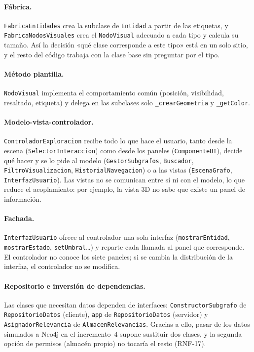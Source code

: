 \paragraph{Fábrica.} \texttt{FabricaEntidades} crea la subclase de \texttt{Entidad} a partir de las etiquetas, y \texttt{FabricaNodosVisuales} crea el \texttt{NodoVisual} adecuado a cada tipo y calcula su tamaño. Así la decisión «qué clase corresponde a este tipo» está en un solo sitio, y el resto del código trabaja con la clase base sin preguntar por el tipo.

\paragraph{Método plantilla.} \texttt{NodoVisual} implementa el comportamiento común (posición, visibilidad, resaltado, etiqueta) y delega en las subclases solo \texttt{\_crearGeometria} y \texttt{\_getColor}.

\paragraph{Modelo-vista-controlador.} \texttt{ControladorExploracion} recibe todo lo que hace el usuario, tanto desde la escena (\texttt{SelectorInteraccion}) como desde los paneles (\texttt{ComponenteUI}), decide qué hacer y se lo pide al modelo (\texttt{GestorSubgrafos}, \texttt{Buscador}, \texttt{FiltroVisualizacion}, \texttt{HistorialNavegacion}) o a las vistas (\texttt{EscenaGrafo}, \texttt{InterfazUsuario}). Las vistas no se comunican entre sí ni con el modelo, lo que reduce el acoplamiento: por ejemplo, la vista 3D no sabe que existe un panel de información.

\paragraph{Fachada.} \texttt{InterfazUsuario} ofrece al controlador una sola interfaz (\texttt{mostrarEntidad}, \texttt{mostrarEstado}, \texttt{setUmbral}\ldots) y reparte cada llamada al panel que corresponde. El controlador no conoce los siete paneles; si se cambia la distribución de la interfaz, el controlador no se modifica.

\paragraph{Repositorio e inversión de dependencias.} Las clases que necesitan datos dependen de interfaces: \texttt{ConstructorSubgrafo} de \texttt{RepositorioDatos} (cliente), \texttt{app} de \texttt{RepositorioDatos} (servidor) y \texttt{AsignadorRelevancia} de \texttt{AlmacenRelevancias}. Gracias a ello, pasar de los datos simulados a Neo4j en el incremento~4 supone sustituir dos clases, y la segunda opción de permisos (almacén propio) no tocaría el resto (RNF-17).

